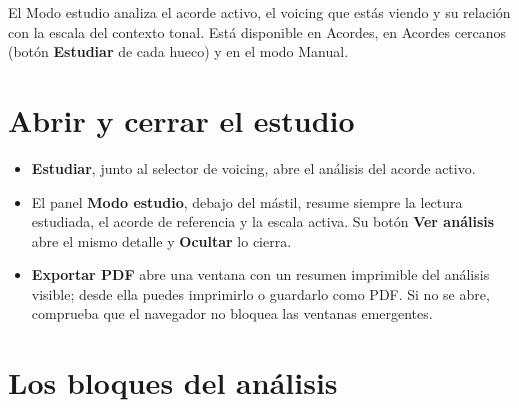 \documentclass[a4paper,11pt,oneside]{report}
\providecommand{\tightlist}{\setlength{\itemsep}{2pt}\setlength{\parskip}{0pt}}
\begin{document}
El Modo estudio analiza el acorde activo, el voicing que estás viendo y su relación con la escala del contexto tonal. Está disponible en Acordes, en Acordes cercanos (botón \textbf{Estudiar} de cada hueco) y en el modo Manual.

\Needspace{3.5cm}
\section{Abrir y cerrar el estudio}\label{abrir-y-cerrar-el-estudio}

\begin{itemize}
\tightlist
\item
  \textbf{Estudiar}, junto al selector de voicing, abre el análisis del acorde activo.
\item
  El panel \textbf{Modo estudio}, debajo del mástil, resume siempre la lectura estudiada, el acorde de referencia y la escala activa. Su botón \textbf{Ver análisis} abre el mismo detalle y \textbf{Ocultar} lo cierra.
\item
  \textbf{Exportar PDF} abre una ventana con un resumen imprimible del análisis visible; desde ella puedes imprimirlo o guardarlo como PDF. Si no se abre, comprueba que el navegador no bloquea las ventanas emergentes.
\end{itemize}

\Needspace{3.5cm}
\section{Los bloques del análisis}\label{los-bloques-del-anuxe1lisis}
\end{document}

